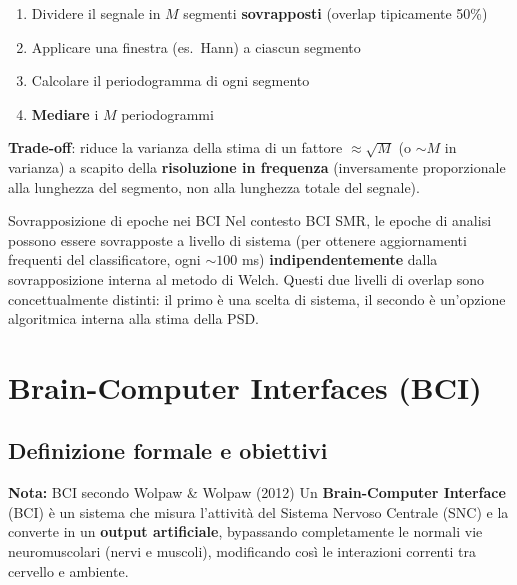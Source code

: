\begin{enumerate}
    \item Dividere il segnale in $M$ segmenti \textbf{sovrapposti} (overlap tipicamente 50\%)
    \item Applicare una finestra (es.\ Hann) a ciascun segmento
    \item Calcolare il periodogramma di ogni segmento
    \item \textbf{Mediare} i $M$ periodogrammi
\end{enumerate}

\textbf{Trade-off}: riduce la varianza della stima di un fattore $\approx \sqrt{M}$ (o $\sim M$ in varianza) a scapito della \textbf{risoluzione in frequenza} (inversamente proporzionale alla lunghezza del segmento, non alla lunghezza totale del segnale).

\begin{approfondimento}{Sovrapposizione di epoche nei BCI}
Nel contesto BCI SMR, le epoche di analisi possono essere sovrapposte a livello di sistema (per ottenere aggiornamenti frequenti del classificatore, ogni $\sim 100$ ms) \textbf{indipendentemente} dalla sovrapposizione interna al metodo di Welch. Questi due livelli di overlap sono concettualmente distinti: il primo è una scelta di sistema, il secondo è un'opzione algoritmica interna alla stima della PSD.
\end{approfondimento}

\chapter{Brain-Computer Interfaces (BCI)}

\section{Definizione formale e obiettivi}

\begin{definizione}
    \textbf{Nota:} BCI secondo Wolpaw \& Wolpaw (2012)
    Un \textbf{Brain-Computer Interface} (BCI) è un sistema che misura l'attività del Sistema Nervoso Centrale (SNC) e la converte in un \textbf{output artificiale}, bypassando completamente le normali vie neuromuscolari (nervi e muscoli), modificando così le interazioni correnti tra cervello e ambiente.
\end{definizione}

